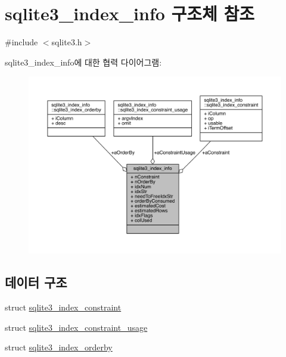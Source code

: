 \hypertarget{structsqlite3__index__info}{}\section{sqlite3\+\_\+index\+\_\+info 구조체 참조}
\label{structsqlite3__index__info}


{\ttfamily \#include $<$sqlite3.\+h$>$}



sqlite3\+\_\+index\+\_\+info에 대한 협력 다이어그램\+:
\nopagebreak
\begin{figure}[H]
\begin{center}
\leavevmode
\includegraphics[width=350pt]{dc/d92/structsqlite3__index__info__coll__graph}
\end{center}
\end{figure}
\subsection*{데이터 구조}
\begin{DoxyCompactItemize}
\item 
struct \hyperlink{structsqlite3__index__info_1_1sqlite3__index__constraint}{sqlite3\+\_\+index\+\_\+constraint}
\item 
struct \hyperlink{structsqlite3__index__info_1_1sqlite3__index__constraint__usage}{sqlite3\+\_\+index\+\_\+constraint\+\_\+usage}
\item 
struct \hyperlink{structsqlite3__index__info_1_1sqlite3__index__orderby}{sqlite3\+\_\+index\+\_\+orderby}
\end{DoxyCompactItemize}

